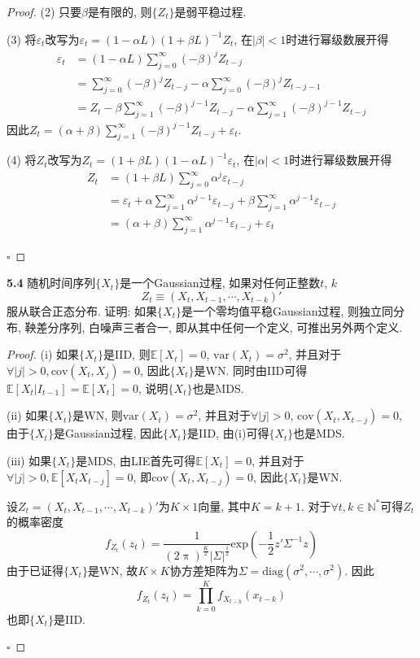 \documentclass[cn,12pt,math=mtpro2,citestyle=gb7714-2015,bibstyle=gb7714-2015,twocol,mode=simple]{elegantbook}
\newcommand{\E}{\mathbb{E}}
\newcommand{\var}{\text{var}}
\begin{document}
\begin{proof}
  (2) 只要$\beta$是有限的, 则$\{Z_t\}$是弱平稳过程.

  (3) 将$\varepsilon_t$改写为$\varepsilon_t=(1-\alpha L)(1+\beta L)^{-1}Z_t$, 在$|\beta|<1$时进行幂级数展开得
  \begin{align*}
  \varepsilon_t&=(1-\alpha L)\sum_{j=0}^{\infty}(-\beta)^jZ_{t-j} \\
  &=\sum_{j=0}^{\infty}(-\beta)^jZ_{t-j}-\alpha\sum_{j=0}^{\infty}(-\beta)^jZ_{t-j-1} \\
  &=Z_t-\beta\sum_{j=1}^{\infty}(-\beta)^{j-1}Z_{t-j}-\alpha\sum_{j=1}^{\infty}(-\beta)^{j-1}Z_{t-j}
  \end{align*}
  因此$\displaystyle Z_t=(\alpha+\beta)\sum_{j=1}^{\infty}(-\beta)^{j-1}Z_{t-j}+\varepsilon_t$.

  (4) 将$Z_t$改写为$Z_t=(1+\beta L)(1-\alpha L)^{-1}\varepsilon_t$, 在$|\alpha|<1$时进行幂级数展开得
  \begin{align*}
  Z_t&=(1+\beta L)\sum_{j=0}^{\infty}\alpha^j\varepsilon_{t-j} \\
  &=\varepsilon_t+\alpha\sum_{j=1}^{\infty}\alpha^{j-1}\varepsilon_{t-j}+\beta\sum_{j=1}^{\infty}\alpha^{j-1}\varepsilon_{t-j} \\
  &=(\alpha+\beta)\sum_{j=1}^{\infty}\alpha^{j-1}\varepsilon_{t-j}+\varepsilon_t
  \end{align*}

  $\square$
\end{proof}

\textbf{5.4} 随机时间序列$\{X_t\}$是一个Gaussian过程, 如果对任何正整数$t$, $k$
  $$Z_t\equiv(X_t,X_{t-1},\cdots,X_{t-k})'$$
  服从联合正态分布. 证明: 如果$\{X_t\}$是一个零均值平稳Gaussian过程, 则独立同分布, 鞅差分序列, 白噪声三者合一, 即从其中任何一个定义, 可推出另外两个定义.

\begin{proof}
  (i) 如果$\{X_t\}$是IID, 则$\E[X_t]=0$, $\var(X_t)=\sigma^2$, 并且对于$\forall |j|>0, \text{cov}(X_t,X_j)=0$, 因此$\{X_t\}$是WN. 同时由IID可得$\E[X_t|I_{t-1}]=\E[X_t]=0$, 说明$\{X_t\}$也是MDS.

  (ii) 如果$\{X_t\}$是WN, 则$\var(X_t)=\sigma^2$, 并且对于$\forall |j|>0$, $\text{cov}(X_t,X_{t-j})=0$, 由于$\{X_t\}$是Gaussian过程, 因此$\{X_t\}$是IID, 由(i)可得$\{X_t\}$也是MDS.

  (iii) 如果$\{X_t\}$是MDS, 由LIE首先可得$\E[X_t]=0$, 并且对于$\forall |j|>0, \E[X_tX_{t-j}]=0$, 即$\text{cov}(X_t,X_{t-j})=0$, 因此$\{X_t\}$是WN.

  设$Z_t=(X_t,X_{t-1},\cdots,X_{t-k})'$为$K\times 1$向量, 其中$K=k+1$. 对于$\forall t, k \in \mathbb{N}^\ast$可得$Z_t$的概率密度
  $$f_{Z_t}(z_t)=\frac{1}{(2\uppi)^\frac{K}{2}|\Sigma|^{\frac{1}{2}}}\text{exp}\left(-\frac{1}{2}z{'}\Sigma^{-1}z\right)$$
  由于已证得$\{X_t\}$是WN, 故$K\times K$协方差矩阵为$\Sigma=\text{diag}(\sigma^2,\cdots,\sigma^2)$. 因此
  $$f_{Z_t}(z_t)=\prod_{k=0}^{K}f_{X_{t-k}}(x_{t-k})$$
  也即$\{X_t\}$是IID.

  $\square$
\end{proof}
\end{document}
